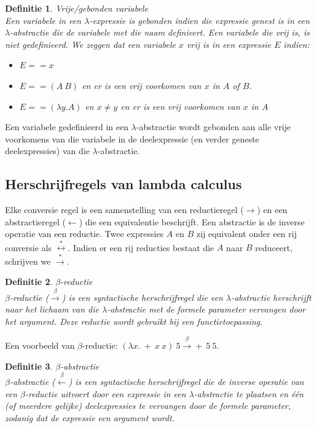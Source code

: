\documentclass[a4paper]{article}
\newtheorem{tdefinitie}{Definitie}[section]
\newenvironment{definitie}[1]%
  {\begin{mdframed}[backgroundcolor=silver,
    topline=false,
    rightline=false,
    leftline=false,
    bottomline=false]\begin{tdefinitie}#1\\\normalfont}%
  {\end{tdefinitie}\end{mdframed}}
\begin{document}
\begin{definitie}{Vrije/gebonden variabele}
  Een variabele in een $\lambda$-expressie is gebonden indien die expressie genest is in een $\lambda$-abstractie die de variabele met die naam definieert. Een variabele die vrij is, is niet gedefinieerd. We zeggen dat een variabele $x$ vrij is in een expressie $E$ indien:
  \begin{itemize}
  \item $E == x$
  \item $E == (A\ B)$ en er is een vrij voorkomen van $x$ in $A$ of $B$.
  \item $E == (\lambda y. A)$ en $x \neq y$ en er is een vrij voorkomen van $x$ in $A$
  \end{itemize}
\end{definitie}

Een variabele gedefinieerd in een $\lambda$-abstractie wordt gebonden aan alle vrije voorkomens van die variabele in de deelexpressie (en verder geneste deelexpressies) van die $\lambda$-abstractie.

\subsection{Herschrijfregels van lambda calculus}

Elke conversie regel is een samenstelling van een reductieregel ($\longrightarrow$) en een abstractieregel ($\longleftarrow$) die een equivalentie beschrijft. Een abstractie is de inverse operatie van een reductie. Twee expressies $A$ en $B$ zij equivalent onder een rij conversie als $\stackrel{*}{\longleftrightarrow}$. Indien er een rij reducties bestaat die $A$ naar $B$ reduceert, schrijven we $\stackrel{*}{\longrightarrow}$.

\begin{definitie}{$\beta$-reductie}
  $\beta$-reductie ($\stackrel{\beta}{\longrightarrow}$) is een syntactische herschrijfregel die een $\lambda$-abstractie herschrijft naar het lichaam van die $\lambda$-abstractie met de formele parameter vervangen door het argument. Deze reductie wordt gebruikt bij een functietoepassing.
\end{definitie}

Een voorbeeld van $\beta$-reductie: $(\lambda x.\ +\ x\ x)\ 5 \stackrel{\beta}{\longrightarrow} +\ 5\ 5$.

\begin{definitie}{$\beta$-abstractie}
  $\beta$-abstractie ($\stackrel{\beta}{\longleftarrow}$) is een syntactische herschrijfregel die de inverse operatie van een $\beta$-reductie uitvoert door een expressie in een $\lambda$-abstractie te plaatsen en \'e\'en (of meerdere gelijke) deelexpressies te vervangen door de formele parameter, zodanig dat de expressie een argument wordt.
\end{definitie}
\end{document}

